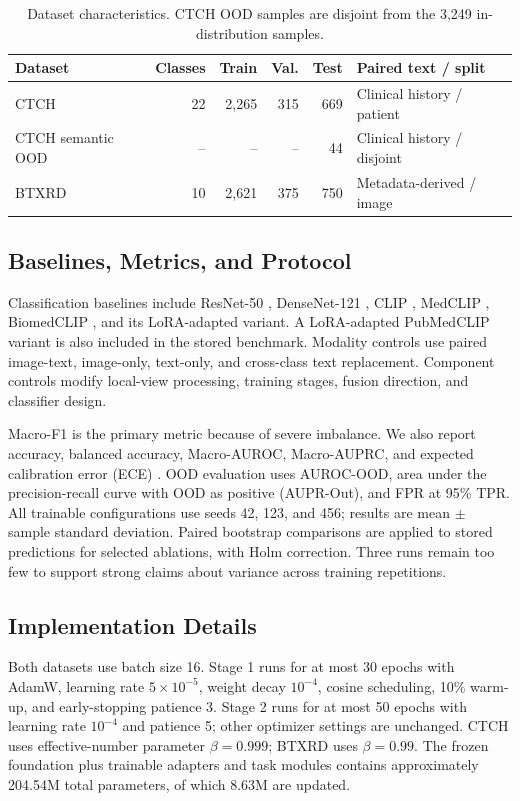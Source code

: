 \documentclass[runningheads]{llncs}
\begin{document}
\begin{table}[t]
\caption{Dataset characteristics. CTCH OOD samples are disjoint from the 3,249 in-distribution samples.}
\label{tab:data}
\centering
\small
\begin{tabular}{lrrrrl}
\toprule
Dataset & Classes & Train & Val. & Test & Paired text / split \\
\midrule
CTCH & 22 & 2,265 & 315 & 669 & Clinical history / patient \\
CTCH semantic OOD & -- & -- & -- & 44 & Clinical history / disjoint \\
BTXRD & 10 & 2,621 & 375 & 750 & Metadata-derived / image \\
\bottomrule
\end{tabular}
\end{table}

\subsection{Baselines, Metrics, and Protocol}

Classification baselines include ResNet-50 \cite{ResNet}, DenseNet-121 \cite{DenseNet}, CLIP \cite{CLIP}, MedCLIP \cite{MedCLIP}, BiomedCLIP \cite{BiomedCLIP}, and its LoRA-adapted variant. A LoRA-adapted PubMedCLIP variant is also included in the stored benchmark. Modality controls use paired image-text, image-only, text-only, and cross-class text replacement. Component controls modify local-view processing, training stages, fusion direction, and classifier design.

Macro-F1 is the primary metric because of severe imbalance. We also report accuracy, balanced accuracy, Macro-AUROC, Macro-AUPRC, and expected calibration error (ECE) \cite{Guo2017Calibration}. OOD evaluation uses AUROC-OOD, area under the precision-recall curve with OOD as positive (AUPR-Out), and FPR at 95\% TPR. All trainable configurations use seeds 42, 123, and 456; results are mean $\pm$ sample standard deviation. Paired bootstrap comparisons are applied to stored predictions for selected ablations, with Holm correction. Three runs remain too few to support strong claims about variance across training repetitions.

\subsection{Implementation Details}

Both datasets use batch size 16. Stage 1 runs for at most 30 epochs with AdamW, learning rate $5\times10^{-5}$, weight decay $10^{-4}$, cosine scheduling, 10\% warm-up, and early-stopping patience 3. Stage 2 runs for at most 50 epochs with learning rate $10^{-4}$ and patience 5; other optimizer settings are unchanged. CTCH uses effective-number parameter $\beta=0.999$; BTXRD uses $\beta=0.99$. The frozen foundation plus trainable adapters and task modules contains approximately 204.54M total parameters, of which 8.63M are updated.
\end{document}
